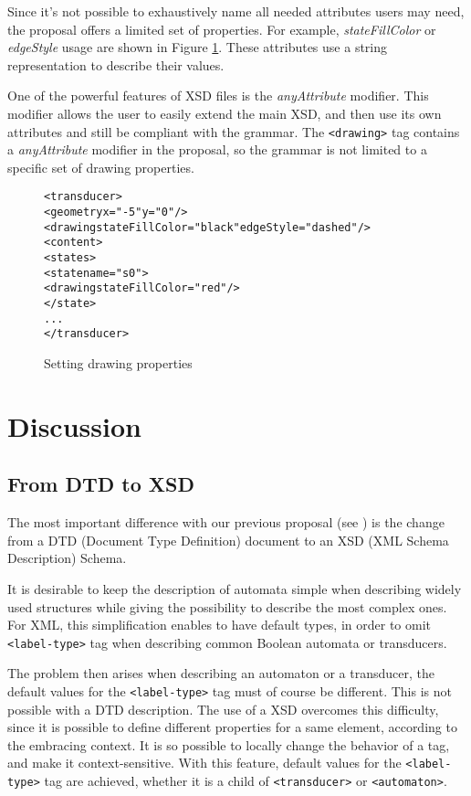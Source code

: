 \documentclass[a4paper]{llncs}
\def\typetag{\texttt{<label-type>}}
\def\drawingtag{\texttt{<drawing>}}
\def\automatontag{\texttt{<automaton>}}
\def\transducertag{\texttt{<transducer>}}
\begin{document}
Since it's not possible to exhaustively
name all needed attributes users may need, the proposal offers a
limited set of properties. For example, \textit{stateFillColor} or
\textit{edgeStyle} usage are shown in Figure \ref{drawing1}. These
attributes use a string representation to describe their values.

One of the powerful features of XSD files is the
\textit{anyAttribute} modifier. This modifier allows the user to easily
extend the main XSD, and then use its own attributes and still be
compliant with the grammar. The \drawingtag{} tag contains a
\textit{anyAttribute} modifier in the proposal, so the grammar is not
limited to a specific set of drawing properties.

{\small

\begin{figure}[h]
  \begin{center}
\begin{alltt}
<transducer>
  <geometry x="-5" y="0"/>
  <drawing stateFillColor="black" edgeStyle="dashed"/>
  <content>
     <states>
        <state name="s0">
            <drawing stateFillColor="red"/>
        </state>
      ...
</transducer>
\end{alltt}

\caption{Setting drawing properties}
\label{drawing1}
  \end{center}
\end{figure}
}

\section{Discussion}
\subsection{From DTD to XSD}
The most important difference with our previous proposal (see \cite{VXML04}) is
the change from a DTD (Document Type Definition) document to an XSD (XML Schema
Description) Schema.

It is desirable to keep the description of automata simple when
describing widely used structures while giving the possibility to
describe the most complex ones. For XML, this simplification enables
to have default types, in order to omit \typetag{} tag when
describing common Boolean automata or transducers.

The problem then arises when describing an automaton or a transducer,
the default values for the \typetag{} tag must of course be
different. This is not possible with a DTD description.  The use of a
XSD overcomes this difficulty, since it is possible to define
different properties for a same element, according to the embracing
context. It is so possible to locally change the behavior of a tag, and
make it context-sensitive. With this feature, default values for the
\typetag{} tag are achieved, whether it is a child of
\transducertag{} or \automatontag{}.
\end{document}
